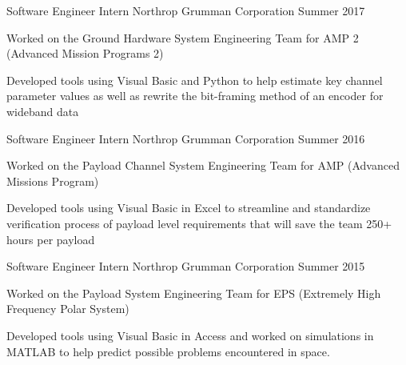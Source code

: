 \vspace{-2mm}


\begin{cventries}
  \cventry
    {Software Engineer Intern} %
    {Northrop Grumman Corporation} %
    {Summer 2017} %
    {} %
    {
      \begin{cvitems} %
        \item {Worked on the Ground Hardware System Engineering Team for AMP 2 (Advanced Mission Programs 2)}
        \item {Developed tools using Visual Basic and Python to help estimate key channel parameter values as well as rewrite the bit-framing method of an encoder for wideband data}
      \end{cvitems}
    }


  \cventry
    {Software Engineer Intern} %
    {Northrop Grumman Corporation} %
    {Summer 2016} %
    {} %
    {
      \begin{cvitems} %
        \item {Worked on the Payload Channel System Engineering Team for AMP (Advanced Missions Program)}
        \item {Developed tools using Visual Basic in Excel to streamline and standardize verification process of payload level requirements that will save the team 250+ hours per payload}
      \end{cvitems}
    }

  \cventry
    {Software Engineer Intern} %
    {Northrop Grumman Corporation} %
    {Summer 2015} %
    {} %
    {
      \begin{cvitems} %
        \item {Worked on the Payload System Engineering Team for EPS (Extremely High Frequency Polar System)}
        \item {Developed tools using Visual Basic in Access and worked on simulations in MATLAB to help predict possible problems encountered in space.}
      \end{cvitems}
    }


\end{cventries}
